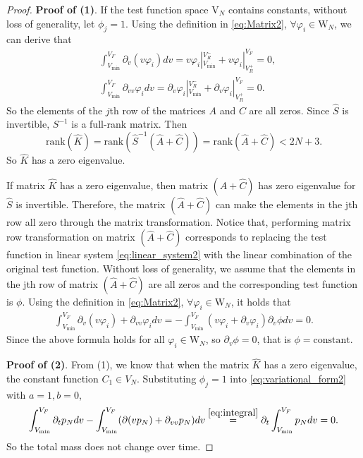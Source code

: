 \begin{proof}
\textbf{Proof of (1)}. 
If the test function space $\mathrm{V}_N$ contains constants, without loss of generality, let $\phi_j=1$. Using the definition in \eqref{eq:Matrix2}, $\forall \varphi_i \in \mathrm{W}_N$, we can derive that
\begin{equation}
    \label{eq:integral}
    \begin{aligned}
        &\int_{V_{\min}}^{V_F}\partial_v(v\varphi_i) dv=v\varphi_i |_{V_{\min}}^{V_R^-}+v\varphi_i |_{V_R^+}^{V_F}=0,\\
        &\int_{V_{\min}}^{V_F}\partial_{vv}\varphi_i dv=\partial_v\varphi_i |_{V_{\min}}^{V_R^-}+\partial_v\varphi_i |_{V_R^+}^{V_F}=0.
    \end{aligned}
\end{equation}
So the elements of the $j$th row of the matrices $A$ and $C$ are all zeros. Since $\hat{S}$ is invertible, $S^{-1}$ is a full-rank matrix. Then
\begin{equation}
    \text{rank}(\hat{K})=\text{rank}(\hat{S}^{-1}(\hat{A}+\hat{C}))=\text{rank}(\hat{A}+\hat{C})<2N+3.
\end{equation}
So $\hat{K}$ has a zero eigenvalue.


If matrix $\hat{K}$ has a zero eigenvalue, then matrix $(\hat{A}+\hat{C})$ has zero eigenvalue for $\hat{S}$ is invertible. Therefore, the matrix $(\hat{A}+\hat{C})$ can make the elements in the jth row all zero through the matrix transformation. Notice that, performing matrix row transformation on matrix $(\hat{A}+\hat{C})$ corresponds to replacing the test function in linear system \eqref{eq:linear_system2}  with the linear combination of the original test function. Without loss of generality, we assume that the elements in the jth row of matrix $(\hat{A}+\hat{C})$ are all zeros and the corresponding test function is $\phi$. Using the definition in \eqref{eq:Matrix2}, $\forall \varphi_i \in \mathrm{W}_N$,  it holds that
\begin{equation}
    \begin{aligned}
        \int_{V_{\min}}^{V_F}\partial_v(v\varphi_i) +\partial_{vv}\varphi_i dv=-\int_{V_{\min}}^{V_F} (v\varphi_i+\partial_v\varphi_i)\partial_v\phi dv=0.
    \end{aligned}
\end{equation}
Since the above formula holds for all $\varphi_i \in \mathrm{W}_N$, so $\partial_v\phi=0$, that is $\phi= \text{constant}$.

\textbf{Proof of (2)}.
From (1), we know that when the matrix $\hat{K}$ has a zero eigenvalue,  the constant function $C_1 \in V_N$. Substituting $\phi_j=1$ into \eqref{eq:variational_form2} with $a=1,b=0$,
\begin{equation}
    \int_{V_{\min}}^{V_F} \partial_t p_N dv-\int_{V_{\min}}^{V_F}(\partial(vp_N)+\partial_{vv}p_N) dv\overset{\eqref{eq:integral}}{=}\partial_t \int_{V_{\min}}^{V_F} p_N dv=0.
\end{equation}
So the total mass does not change over time.
\end{proof}

